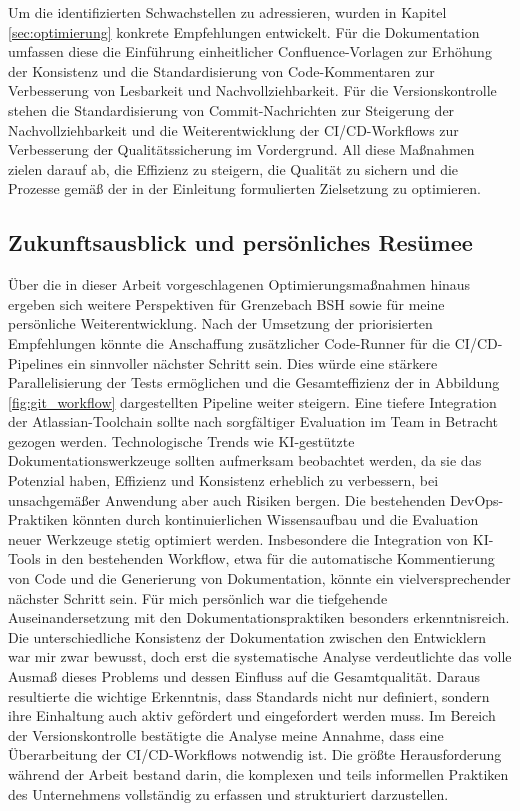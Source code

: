 \documentclass[12pt,oneside]{article}
\begin{document}
    \newline
    Um die identifizierten Schwachstellen zu adressieren, wurden in Kapitel \ref{sec:optimierung} konkrete Empfehlungen entwickelt. Für die Dokumentation umfassen diese die Einführung einheitlicher Confluence-Vorlagen zur Erhöhung der Konsistenz und die Standardisierung von Code-Kommentaren zur Verbesserung von Lesbarkeit und Nachvollziehbarkeit. Für die Versionskontrolle stehen die Standardisierung von Commit-Nachrichten zur Steigerung der Nachvollziehbarkeit und die Weiterentwicklung der CI/CD-Workflows zur Verbesserung der Qualitätssicherung im Vordergrund. All diese Maßnahmen zielen darauf ab, die Effizienz zu steigern, die Qualität zu sichern und die Prozesse gemäß der in der Einleitung formulierten Zielsetzung zu optimieren.

    \subsection{Zukunftsausblick und persönliches Resümee}
    \label{subsec:zukunft}
    Über die in dieser Arbeit vorgeschlagenen Optimierungsmaßnahmen hinaus ergeben sich weitere Perspektiven für Grenzebach BSH sowie für meine persönliche Weiterentwicklung.
    \newline
    Nach der Umsetzung der priorisierten Empfehlungen könnte die Anschaffung zusätzlicher Code-Runner für die CI/CD-Pipelines ein sinnvoller nächster Schritt sein. Dies würde eine stärkere Parallelisierung der Tests ermöglichen und die Gesamteffizienz der in Abbildung \ref{fig:git_workflow} dargestellten Pipeline weiter steigern. Eine tiefere Integration der Atlassian-Toolchain sollte nach sorgfältiger Evaluation im Team in Betracht gezogen werden. Technologische Trends wie KI-gestützte Dokumentationswerkzeuge sollten aufmerksam beobachtet werden, da sie das Potenzial haben, Effizienz und Konsistenz erheblich zu verbessern, bei unsachgemäßer Anwendung aber auch Risiken bergen. Die bestehenden DevOps-Praktiken könnten durch kontinuierlichen Wissensaufbau und die Evaluation neuer Werkzeuge stetig optimiert werden. Insbesondere die Integration von KI-Tools in den bestehenden Workflow, etwa für die automatische Kommentierung von Code und die Generierung von Dokumentation, könnte ein vielversprechender nächster Schritt sein.
    \newline
    Für mich persönlich war die tiefgehende Auseinandersetzung mit den Dokumentationspraktiken besonders erkenntnisreich. Die unterschiedliche Konsistenz der Dokumentation zwischen den Entwicklern war mir zwar bewusst, doch erst die systematische Analyse verdeutlichte das volle Ausmaß dieses Problems und dessen Einfluss auf die Gesamtqualität. Daraus resultierte die wichtige Erkenntnis, dass Standards nicht nur definiert, sondern ihre Einhaltung auch aktiv gefördert und eingefordert werden muss. Im Bereich der Versionskontrolle bestätigte die Analyse meine Annahme, dass eine Überarbeitung der CI/CD-Workflows notwendig ist. Die größte Herausforderung während der Arbeit bestand darin, die komplexen und teils informellen Praktiken des Unternehmens vollständig zu erfassen und strukturiert darzustellen.
\end{document}
